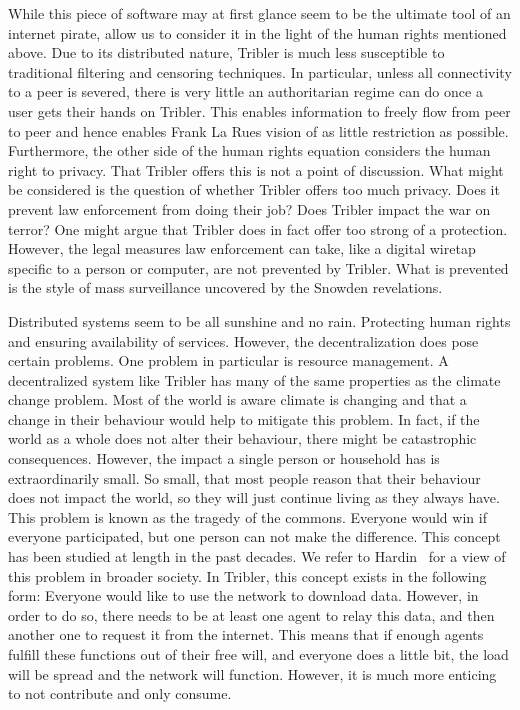\documentclass[a4paper,11pt]{book}
\theoremstyle{definition}
\begin{document}
While this piece of software may at first glance seem to be the ultimate tool of an internet pirate, 
allow us to consider it in the light of the human rights mentioned above. Due to its
distributed nature, Tribler is much less susceptible to traditional filtering and
censoring techniques. In particular, unless all connectivity to a peer is severed,
there is very little an authoritarian regime can do once a user gets their hands
on Tribler. This enables information to freely flow from peer to peer and hence 
enables Frank La Rues vision of as little restriction as possible. 
Furthermore, the other side of the human rights equation considers the human
right to privacy. That Tribler offers this is not a point of discussion. What might
be considered is the question of whether Tribler offers too much privacy. Does it
prevent law enforcement from doing their job? Does Tribler impact the war on terror?
One might argue that Tribler does in fact offer too strong of a protection.
However, the legal measures law enforcement can take, like a digital
wiretap specific to a person or computer, are not prevented by Tribler. What is
prevented is the style of mass surveillance uncovered by the Snowden revelations. 

Distributed systems seem to be all sunshine and no rain. Protecting human rights 
and ensuring availability of services. However, the decentralization does pose certain 
problems. One problem in particular is resource management. A decentralized system
like Tribler has many of the same properties as the climate change problem. Most of the
world is aware climate is changing and that a change in their behaviour would help to
mitigate this problem. In fact, if the world as a whole does not alter their behaviour,
there might be catastrophic consequences. However, the impact a single person or household
has is extraordinarily small. So small, that most people reason that their behaviour
does not impact the world, so they will just continue living as they always have. 
This problem is known as the tragedy of the commons. Everyone would win if everyone
participated, but one person can not make the difference. 
This concept has been studied at length in the past decades. We refer to
Hardin~\cite{hardin2009tragedy} for a view of this problem in broader society.
In Tribler, this concept exists in the following form: Everyone would like to use 
the network to download data. However, in order to do so, there needs to be at least
one agent to relay this data, and then another one to request it from the internet.
This means that if enough agents fulfill these functions out of their free will,
and everyone does a little bit, the load will be spread and the network will
function. However, it is much more enticing to not contribute and only consume.
\end{document}
